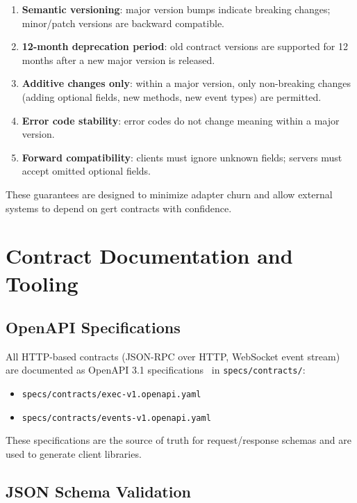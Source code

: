 \begin{enumerate}
  \item \textbf{Semantic versioning}: major version bumps indicate breaking
        changes; minor/patch versions are backward compatible.
  \item \textbf{12-month deprecation period}: old contract versions are
        supported for 12 months after a new major version is released.
  \item \textbf{Additive changes only}: within a major version, only
        non-breaking changes (adding optional fields, new methods, new event
        types) are permitted.
  \item \textbf{Error code stability}: error codes do not change meaning within
        a major version.
  \item \textbf{Forward compatibility}: clients must ignore unknown fields;
        servers must accept omitted optional fields.
\end{enumerate}

These guarantees are designed to minimize adapter churn and allow external
systems to depend on gert contracts with confidence.

\section{Contract Documentation and Tooling}

\subsection{OpenAPI Specifications}

All HTTP-based contracts (JSON-RPC over HTTP, WebSocket event stream) are
documented as OpenAPI 3.1 specifications~\cite{openapi-spec} in
\texttt{specs/contracts/}:

\begin{itemize}
  \item \texttt{specs/contracts/exec-v1.openapi.yaml}
  \item \texttt{specs/contracts/events-v1.openapi.yaml}
\end{itemize}

These specifications are the source of truth for request/response schemas and
are used to generate client libraries.

\subsection{JSON Schema Validation}


